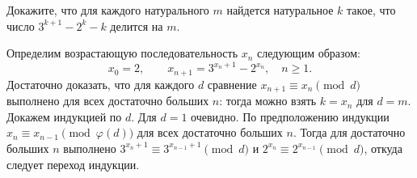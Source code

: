 \problem
Докажите, что для каждого натурального $m$ найдется натуральное $k$ такое, что
число $3^{k+1} - 2^k - k$ делится на $m$.


\solution
Определим возрастающую последовательность $x_n$ следующим образом:
\[
    x_0 = 2
,\qquad
    x_{n+1} = 3^{x_n + 1} - 2^{x_n}
,\quad
    n \geq 1
.\]
Достаточно доказать, что для каждого $d$ сравнение
$x_{n+1} \equiv x_n \pmod{d}$ выполнено для всех достаточно больших $n$:
тогда можно взять $k = x_n$ для $d = m$.
Докажем индукцией по $d$.
Для $d = 1$ очевидно.
По предположению индукции
$x_n \equiv x_{n-1} \pmod{\varphi(d)}$
для всех достаточно больших $n$.
Тогда для достаточно больших $n$ выполнено
$3^{x_n + 1} \equiv 3^{x_{n-1} + 1} \pmod d$ и
$2^{x_n} \equiv 2^{x_{n-1}} \pmod d$,
откуда следует переход индукции.


\endproblem
